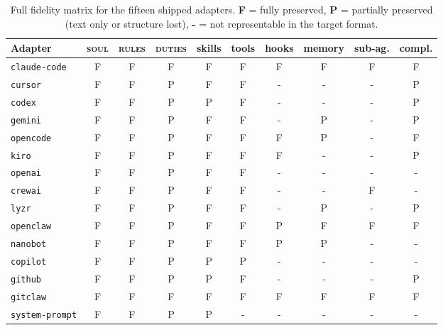 \documentclass[11pt,a4paper]{article}
\begin{document}
\begin{table}[h]
\centering
\scriptsize
\begin{tabular}{@{}lccccccccc@{}}
\toprule
Adapter & \textsc{soul} & \textsc{rules} & \textsc{duties} & skills & tools & hooks & memory & sub-ag. & compl. \\
\midrule
\texttt{claude-code}     & F & F & F & F & F & F & F & F & F \\
\texttt{cursor}          & F & F & P & F & F & - & - & - & P \\
\texttt{codex}           & F & F & P & P & F & - & - & - & P \\
\texttt{gemini}          & F & F & P & F & F & - & P & - & P \\
\texttt{opencode}        & F & F & P & F & F & F & P & - & F \\
\texttt{kiro}            & F & F & P & F & F & F & - & - & P \\
\texttt{openai}          & F & F & P & F & F & - & - & - & - \\
\texttt{crewai}          & F & F & P & F & F & - & - & F & - \\
\texttt{lyzr}            & F & F & P & F & F & - & P & - & P \\
\texttt{openclaw}        & F & F & P & F & F & P & F & F & F \\
\texttt{nanobot}         & F & F & P & F & F & P & P & - & - \\
\texttt{copilot}         & F & F & P & P & P & - & - & - & - \\
\texttt{github}          & F & F & P & P & F & - & - & - & P \\
\texttt{gitclaw}         & F & F & F & F & F & F & F & F & F \\
\texttt{system-prompt}   & F & F & P & P & - & - & - & - & - \\
\bottomrule
\end{tabular}
\caption{Full fidelity matrix for the fifteen shipped adapters. \textbf{F} = fully
preserved, \textbf{P} = partially preserved (text only or structure lost), \textbf{-}
= not representable in the target format.}
\end{table}
\end{document}
